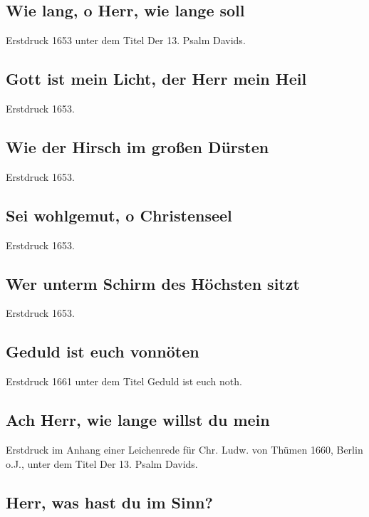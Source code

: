 \subsection*{ Wie lang, o Herr, wie lange soll}

Erstdruck 1653 unter dem Titel \frqq Der 13. Psalm Davids\flqq .

\subsection*{ Gott ist mein Licht, der Herr mein Heil}

Erstdruck 1653.

\subsection*{ Wie der Hirsch im großen Dürsten}

Erstdruck 1653.

\subsection*{ Sei wohlgemut, o Christenseel}

Erstdruck 1653.

\subsection*{ Wer unterm Schirm des Höchsten sitzt}

Erstdruck 1653.

\subsection*{ Geduld ist euch vonnöten}

Erstdruck 1661 unter dem Titel \frqq Geduld ist euch noth\flqq .

\subsection*{ Ach Herr, wie lange willst du mein}

Erstdruck im Anhang einer Leichenrede für Chr. Ludw. von Thümen 1660,
Berlin o.J., unter dem Titel \frqq Der 13. Psalm Davids\flqq .

\subsection*{ Herr, was hast du im Sinn?}

